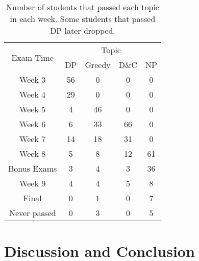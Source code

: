\documentclass{article}
\begin{document}
\begin{table}[h]
\centering
\begin{tabular}{|c|cccc|}
\hline
\multirow{2}{*}{Exam Time} & \multicolumn{4}{c|}{Topic}                                                             \\ \cline{2-5} 
                           & \multicolumn{1}{c|}{DP} & \multicolumn{1}{c|}{Greedy} & \multicolumn{1}{c|}{D\&C} & NP \\ \hline
Week 3                     & \multicolumn{1}{c|}{56} & \multicolumn{1}{c|}{0}      & \multicolumn{1}{c|}{0}    & 0  \\ \hline
Week 4                     & \multicolumn{1}{c|}{29} & \multicolumn{1}{c|}{0}      & \multicolumn{1}{c|}{0}    & 0  \\ \hline
Week 5                     & \multicolumn{1}{c|}{4}  & \multicolumn{1}{c|}{46}     & \multicolumn{1}{c|}{0}    & 0  \\ \hline
Week 6                     & \multicolumn{1}{c|}{6}  & \multicolumn{1}{c|}{33}     & \multicolumn{1}{c|}{66}   & 0  \\ \hline
Week 7                     & \multicolumn{1}{c|}{14} & \multicolumn{1}{c|}{18}     & \multicolumn{1}{c|}{31}   & 0  \\ \hline
Week 8                     & \multicolumn{1}{c|}{5}  & \multicolumn{1}{c|}{8}      & \multicolumn{1}{c|}{12}   & 61 \\ \hline
Bonus Exams                & \multicolumn{1}{c|}{3}  & \multicolumn{1}{c|}{4}      & \multicolumn{1}{c|}{3}    & 36 \\ \hline
Week 9                     & \multicolumn{1}{c|}{4}  & \multicolumn{1}{c|}{4}      & \multicolumn{1}{c|}{5}    & 8  \\ \hline
Final                      & \multicolumn{1}{c|}{0}  & \multicolumn{1}{c|}{1}      & \multicolumn{1}{c|}{0}    & 7  \\ \hline
Never passed               & \multicolumn{1}{c|}{0}  & \multicolumn{1}{c|}{3}      & \multicolumn{1}{c|}{0}    & 5  \\ \hline
\end{tabular}
\caption{Number of students that passed each topic in each week. Some students that passed DP later dropped.}
\label{table:weeks passed}
\end{table}

\section{Discussion and Conclusion}
\end{document}
